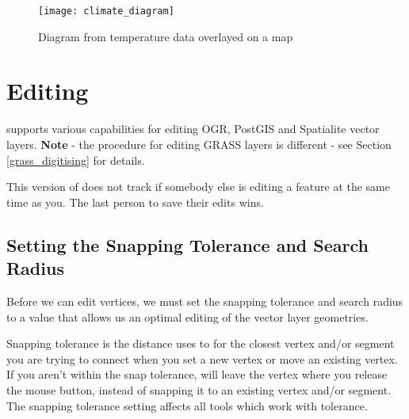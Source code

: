 \begin{figure}[ht]
   \centering
   \texttt{[image: climate\_diagram]}
   \caption{Diagram from temperature data overlayed on a map \nixcaption}
   \label{fig:climatediagram}
\end{figure}

\section{Editing}

\qg supports various capabilities for editing OGR, PostGIS and Spatialite
vector layers. \textbf{Note} - the procedure for editing GRASS layers is
different - see Section \ref{grass_digitising} for details.

\begin{Tip}\caption{\textsc{Concurrent Edits}}
This version of \qg does not track if somebody else is editing a
feature at the same time as you. The last person to save their edits wins.
\end{Tip}

\subsection{Setting the Snapping Tolerance and Search Radius}
\label{snapping_tolerance}

Before we can edit vertices, we must set the snapping
tolerance and search radius to a value that allows us an optimal editing of
the vector layer geometries.


Snapping tolerance is the distance \qg uses to  for the
closest vertex and/or segment you are trying to
connect when you set a new vertex or move an existing vertex. If you aren't
within the snap tolerance, \qg will leave the vertex where you release the
mouse button, instead of snapping it to an existing vertex and/or segment.
The snapping tolerance setting affects all tools which work with tolerance.

